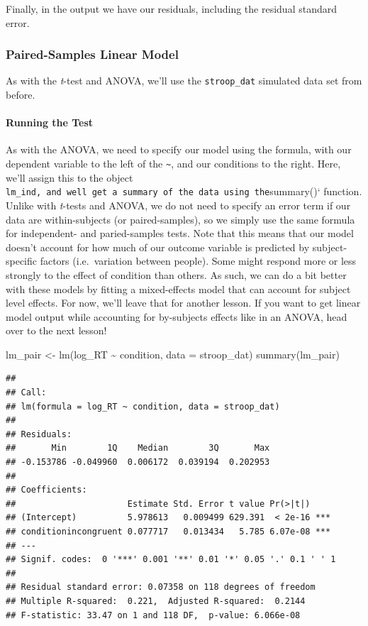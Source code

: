 \documentclass[
]{book}
\newenvironment{Shaded}{\begin{snugshade}}{\end{snugshade}}
\newcommand{\AttributeTok}[1]{\textcolor[rgb]{0.77,0.63,0.00}{#1}}
\newcommand{\FunctionTok}[1]{\textcolor[rgb]{0.00,0.00,0.00}{#1}}
\newcommand{\NormalTok}[1]{#1}
\newcommand{\OtherTok}[1]{\textcolor[rgb]{0.56,0.35,0.01}{#1}}
\newcommand{\SpecialCharTok}[1]{\textcolor[rgb]{0.00,0.00,0.00}{#1}}
\begin{document}
Finally, in the output we have our residuals, including the residual standard error.

\hypertarget{paired-samples-linear-model}{%
\subsubsection{Paired-Samples Linear Model}\label{paired-samples-linear-model}}

As with the \emph{t}-test and ANOVA, we'll use the \texttt{stroop\_dat} simulated data set from before.

\hypertarget{running-the-test-4}{%
\paragraph{Running the Test}\label{running-the-test-4}}

As with the ANOVA, we need to specify our model using the formula, with our dependent variable to the left of the \texttt{\textasciitilde{}}, and our conditions to the right. Here, we'll assign this to the object \texttt{lm\_ind\textquotesingle{},\ and\ we\textquotesingle{}ll\ get\ a\ summary\ of\ the\ data\ using\ the}summary()` function. Unlike with \emph{t}-tests and ANOVA, we do not need to specify an error term if our data are within-subjects (or paired-samples), so we simply use the same formula for independent- and paried-samples tests. Note that this means that our model doesn't account for how much of our outcome variable is predicted by subject-specific factors (i.e.~variation between people). Some might respond more or less strongly to the effect of condition than others. As such, we can do a bit better with these models by fitting a mixed-effects model that can account for subject level effects. For now, we'll leave that for another lesson. If you want to get linear model output while accounting for by-subjects effects like in an ANOVA, head over to the next lesson!

\begin{Shaded}
\begin{Highlighting}[]
\NormalTok{lm\_pair }\OtherTok{\textless{}{-}} \FunctionTok{lm}\NormalTok{(log\_RT }\SpecialCharTok{\textasciitilde{}}\NormalTok{ condition, }\AttributeTok{data =}\NormalTok{ stroop\_dat)}
\FunctionTok{summary}\NormalTok{(lm\_pair)}
\end{Highlighting}
\end{Shaded}

\begin{verbatim}
## 
## Call:
## lm(formula = log_RT ~ condition, data = stroop_dat)
## 
## Residuals:
##       Min        1Q    Median        3Q       Max 
## -0.153786 -0.049960  0.006172  0.039194  0.202953 
## 
## Coefficients:
##                      Estimate Std. Error t value Pr(>|t|)    
## (Intercept)          5.978613   0.009499 629.391  < 2e-16 ***
## conditionincongruent 0.077717   0.013434   5.785 6.07e-08 ***
## ---
## Signif. codes:  0 '***' 0.001 '**' 0.01 '*' 0.05 '.' 0.1 ' ' 1
## 
## Residual standard error: 0.07358 on 118 degrees of freedom
## Multiple R-squared:  0.221,  Adjusted R-squared:  0.2144 
## F-statistic: 33.47 on 1 and 118 DF,  p-value: 6.066e-08
\end{verbatim}
\end{document}

